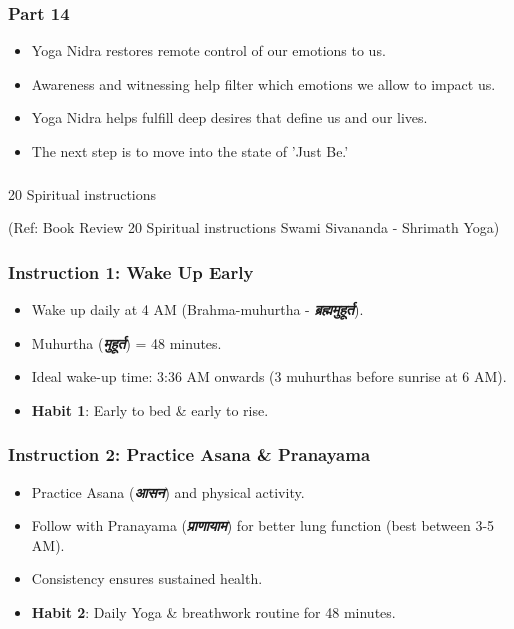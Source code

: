 \begin{frame}[fragile]\frametitle{Part 14}

\begin{itemize}
    \item Yoga Nidra restores remote control of our emotions to us.
    \item Awareness and witnessing help filter which emotions we allow to impact us.
    \item Yoga Nidra helps fulfill deep desires that define us and our lives.
    \item The next step is to move into the state of 'Just Be.'
\end{itemize}

\end{frame}


\begin{frame}[fragile]\frametitle{}
\begin{center}
{\Large 20 Spiritual instructions}
\end{center}

{\tiny (Ref:  Book Review 20 Spiritual instructions Swami Sivananda - Shrimath Yoga)}

\end{frame}

\begin{frame}[fragile]\frametitle{Instruction 1: Wake Up Early}
      \begin{itemize}
          \item Wake up daily at 4 AM (Brahma-muhurtha - \textbf{\textit{\textbf{ब्रह्ममुहूर्त}}}).
          \item Muhurtha (\textbf{\textit{\textbf{मुहूर्त}}}) = 48 minutes.
          \item Ideal wake-up time: 3:36 AM onwards (3 muhurthas before sunrise at 6 AM).
          \item \textbf{Habit 1}: Early to bed \& early to rise.
      \end{itemize}
\end{frame}

\begin{frame}[fragile]\frametitle{Instruction 2: Practice Asana \& Pranayama}
      \begin{itemize}
          \item Practice Asana (\textbf{\textit{आसन}}) and physical activity.
          \item Follow with Pranayama (\textbf{\textit{प्राणायाम}}) for better lung function (best between 3-5 AM).
          \item Consistency ensures sustained health.
          \item \textbf{Habit 2}: Daily Yoga \& breathwork routine for 48 minutes.
      \end{itemize}
\end{frame}

